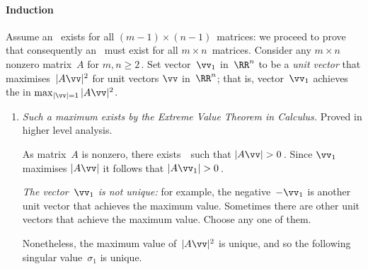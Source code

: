 \paragraph{Induction}  
Assume  an \svd\ exists for all \((m-1)\times(n-1)\)~matrices: we proceed to prove that consequently an \svd\ must exist for all \(m\times n\)~matrices.
Consider any \(m\times n\) nonzero matrix~\(A\) for \(m,n\geq2\)\,.
Set vector~\(\vv_1\) in~\(\RR^n\) to be a \emph{unit vector} that maximises~\(|A\vv|^2\) for unit vectors \(\vv\) in~\(\RR^n\); that is, vector~\(\vv_1\) achieves the  in \(\max_{|\vv|=1}|A\vv|^2\).
\begin{enumerate}
\item \emph{Such a maximum exists by the Extreme Value Theorem in Calculus.}
Proved in higher level analysis.

%
As matrix~\(A\) is nonzero, there exists~\vv\ such that \(|A\vv|>0\)\,.
Since \(\vv_1\) maximises \(|A\vv|\) it follows that \(|A\vv_1|>0\)\,.

\emph{The vector~\(\vv_1\) is not unique:} for example, the negative~\(-\vv_1\) is another unit vector that achieves the maximum value.  
Sometimes there are other unit vectors that achieve the maximum value. 
Choose any one of them. 

Nonetheless, the maximum value of~\(|A\vv|^2\) is unique, and so the following singular value~\(\sigma_1\) is unique.


\end{enumerate}
